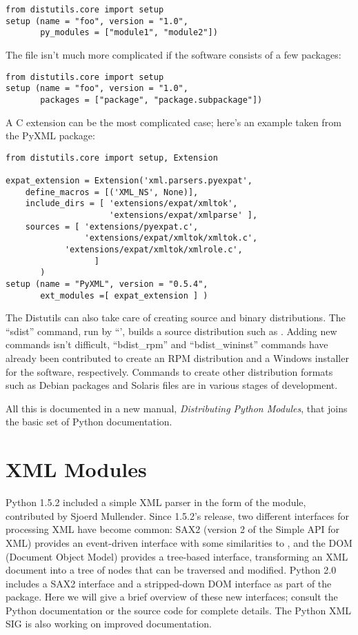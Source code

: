 \documentclass{howto}
\begin{document}
\begin{verbatim}
from distutils.core import setup
setup (name = "foo", version = "1.0", 
       py_modules = ["module1", "module2"])
\end{verbatim}

The  file isn't much more complicated if the software
consists of a few packages:

\begin{verbatim}
from distutils.core import setup
setup (name = "foo", version = "1.0", 
       packages = ["package", "package.subpackage"])
\end{verbatim}

A C extension can be the most complicated case; here's an example taken from 
the PyXML package:


\begin{verbatim}
from distutils.core import setup, Extension

expat_extension = Extension('xml.parsers.pyexpat',
	define_macros = [('XML_NS', None)],
	include_dirs = [ 'extensions/expat/xmltok',
	                 'extensions/expat/xmlparse' ],
	sources = [ 'extensions/pyexpat.c',
	            'extensions/expat/xmltok/xmltok.c',
 		    'extensions/expat/xmltok/xmlrole.c',
                  ]
       )
setup (name = "PyXML", version = "0.5.4", 
       ext_modules =[ expat_extension ] )
\end{verbatim}

The Distutils can also take care of creating source and binary
distributions.  The ``sdist'' command, run by ``', builds a source distribution such as .
Adding new commands isn't difficult, ``bdist_rpm'' and
``bdist_wininst'' commands have already been contributed to create an
RPM distribution and a Windows installer for the software,
respectively.  Commands to create other distribution formats such as
Debian packages and Solaris  files are in various stages of
development.

All this is documented in a new manual, \textit{Distributing Python
Modules}, that joins the basic set of Python documentation.

\section{XML Modules}

Python 1.5.2 included a simple XML parser in the form of the
 module, contributed by Sjoerd Mullender.  Since
1.5.2's release, two different interfaces for processing XML have
become common: SAX2 (version 2 of the Simple API for XML) provides an
event-driven interface with some similarities to , and
the DOM (Document Object Model) provides a tree-based interface,
transforming an XML document into a tree of nodes that can be
traversed and modified.  Python 2.0 includes a SAX2 interface and a
stripped-down DOM interface as part of the  package.
Here we will give a brief overview of these new interfaces; consult
the Python documentation or the source code for complete details.
The Python XML SIG is also working on improved documentation.
\end{document}
